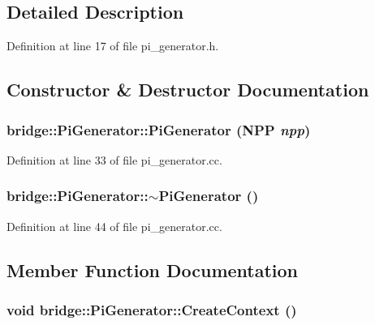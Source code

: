 \subsection{Detailed Description}


Definition at line 17 of file pi\_\-generator.h.



\subsection{Constructor \& Destructor Documentation}
\hypertarget{classbridge_1_1_pi_generator_a1f76a8c23b9f71c440d8a86e91f9b177}{
\subsubsection[{PiGenerator}]{\setlength{\rightskip}{0pt plus 5cm}bridge::PiGenerator::PiGenerator (NPP {\em npp})}}
\label{classbridge_1_1_pi_generator_a1f76a8c23b9f71c440d8a86e91f9b177}


Definition at line 33 of file pi\_\-generator.cc.

\hypertarget{classbridge_1_1_pi_generator_ae2369ad51a1680d21ff001404a8a84b5}{
\subsubsection[{$\sim$PiGenerator}]{\setlength{\rightskip}{0pt plus 5cm}bridge::PiGenerator::$\sim$PiGenerator ()}}
\label{classbridge_1_1_pi_generator_ae2369ad51a1680d21ff001404a8a84b5}


Definition at line 44 of file pi\_\-generator.cc.



\subsection{Member Function Documentation}
\hypertarget{classbridge_1_1_pi_generator_aa5be4efa2d7fe286582ccec734619db4}{
\subsubsection[{CreateContext}]{\setlength{\rightskip}{0pt plus 5cm}void bridge::PiGenerator::CreateContext ()}}
\label{classbridge_1_1_pi_generator_aa5be4efa2d7fe286582ccec734619db4}


